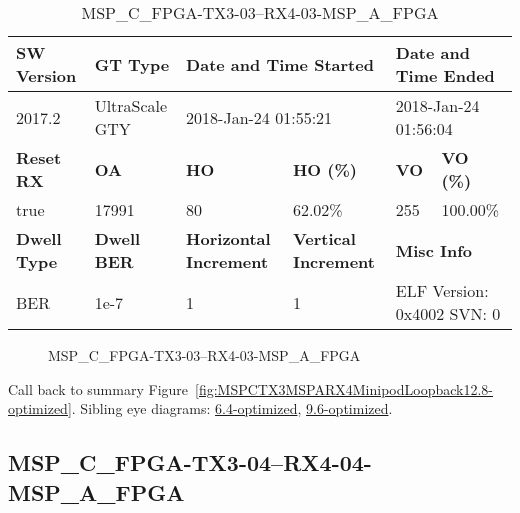 \begin{table}[h]
\centering
\caption{MSP\_C\_FPGA-TX3-03--RX4-03-MSP\_A\_FPGA}
\label{tab:MSPCFPGATX303RX403MSPAFPGA12.8-optimized}
\begin{tabular}{@{}|l|l|l|l|l|l|@{}}
\toprule
\textbf{SW Version}                & \textbf{GT Type}   & \multicolumn{2}{l|}{\textbf{Date and Time Started}}            & \multicolumn{2}{l|}{\textbf{Date and Time Ended}}        \\ \midrule
2017.2                       & UltraScale GTY          & \multicolumn{2}{l|}{2018-Jan-24 01:55:21}                   & \multicolumn{2}{l|}{2018-Jan-24 01:56:04}               \\ \midrule
\textbf{Reset RX}                  & \textbf{OA} & \textbf{HO}   & \textbf{HO (\%)} & \textbf{VO} & \textbf{VO (\%)} \\ \midrule
true & 17991        & 80          & 62.02\%        & 255        & 100.00\%       \\ \midrule
\textbf{Dwell Type}                & \textbf{Dwell BER} & \textbf{Horizontal Increment} & \textbf{Vertical Increment}    & \multicolumn{2}{l|}{\textbf{Misc Info}}                  \\ \midrule
BER                            & 1e-7        & 1        & 1           & \multicolumn{2}{l|}{ELF Version: 0x4002 SVN: 0}                         \\ \bottomrule
\end{tabular}
\end{table}

\begin{figure}[h]
\caption{MSP\_C\_FPGA-TX3-03--RX4-03-MSP\_A\_FPGA} \label{fig:MSPCFPGATX303RX403MSPAFPGA12.8-optimized}
\end{figure}

Call back to summary Figure~\ref{fig:MSPCTX3MSPARX4MinipodLoopback12.8-optimized}.
Sibling eye diagrams: \hyperref[sec:MSPCFPGATX303RX403MSPAFPGA6.4-optimized]{6.4-optimized}, \hyperref[sec:MSPCFPGATX303RX403MSPAFPGA9.6-optimized]{9.6-optimized}.

\clearpage
\newpage


\subsection{MSP\_C\_FPGA-TX3-04--RX4-04-MSP\_A\_FPGA}\label{sec:MSPCFPGATX304RX404MSPAFPGA12.8-optimized}

